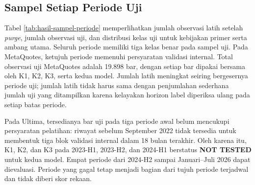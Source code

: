 \subsection{Sampel Setiap Periode Uji}

Tabel \ref{tab:hasil-sampel-periode} memperlihatkan jumlah observasi latih setelah \emph{purge}, jumlah observasi uji, dan distribusi kelas uji untuk kebijakan primer serta ambang utama. Seluruh periode memiliki tiga kelas benar pada sampel uji. Pada MetaQuotes, ketujuh periode memenuhi persyaratan validasi internal. Total observasi uji MetaQuotes adalah 19.898 bar, dengan setiap bar dipakai bersama oleh K1, K2, K3, serta kedua model. Jumlah latih meningkat seiring bergesernya periode uji; jumlah latih tidak harus sama dengan penjumlahan sederhana jumlah uji yang ditampilkan karena kelayakan horizon label diperiksa ulang pada setiap batas periode.

Pada Ultima, tersedianya bar uji pada tiga periode awal belum mencukupi persyaratan pelatihan: riwayat sebelum September 2022 tidak tersedia untuk membentuk tiga blok validasi internal dalam 18 bulan terakhir. Oleh karena itu, K1, K2, dan K3 pada 2023-H1, 2023-H2, dan 2024-H1 berstatus \textbf{NOT TESTED} untuk kedua model. Empat periode dari 2024-H2 sampai Januari--Juli 2026 dapat dievaluasi. Periode yang gagal tetap menjadi bagian dari tujuh periode terjadwal dan tidak diberi skor rekaan.


